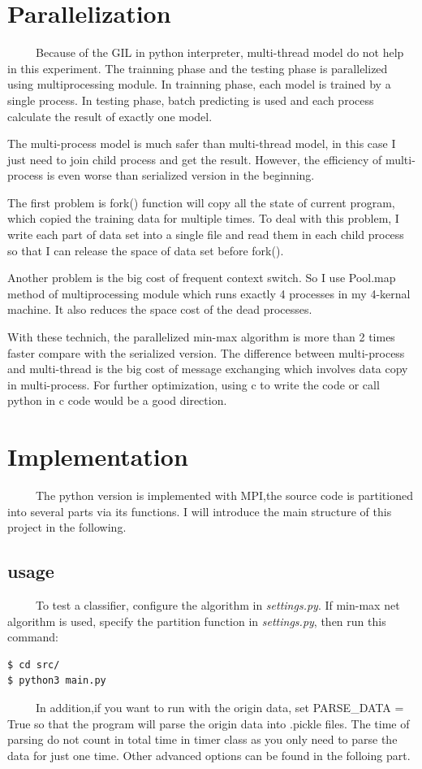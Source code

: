 \documentclass[11pt]{article}
\begin{document}
\section{Parallelization}
\label{sec-3}
\ \ \ \ \ Because of the GIL in python interpreter, multi-thread model do not help in this experiment.
The trainning phase and the testing phase is parallelized using multiprocessing module.
In trainning phase, each model is trained by a single process. In testing phase, batch predicting
is used and each process calculate the result of exactly one model.

The multi-process model is much safer than multi-thread model, in this case I just need to
join child process and get the result. However, the efficiency of multi-process is even
worse than serialized version in the beginning.

The first problem is fork() function will copy all the state of current program, which
copied the training data for multiple times. To deal with this problem, I write each part
of data set into a single file and read them in each child process so that I can release
the space of data set before fork().

Another problem is the big cost of frequent context switch. So I use Pool.map method of
multiprocessing module which runs exactly 4 processes in my 4-kernal machine. It also
reduces the space cost of the dead processes.

With these technich, the parallelized min-max algorithm is more than 2 times faster
compare with the serialized version.
The difference between multi-process and multi-thread is the big cost of message exchanging
which involves data copy in multi-process. For further optimization, using c to write the code
or call python in c code would be a good direction.

\section{Implementation}
\label{sec-4}
\ \ \ \ \ The python version is implemented with MPI,the source code is partitioned into several
parts via its functions. I will introduce the main structure of this project in the following.

\subsection{usage}
\label{sec-4-1}
\ \ \ \ \ To test a classifier, configure the algorithm in \emph{settings.py}. If min-max net algorithm
is used, specify the partition function in \emph{settings.py}, then run this command:
\begin{verbatim}
$ cd src/
$ python3 main.py
\end{verbatim}
\ \ \ \ \ In addition,if you want to run with the origin data, set PARSE\_DATA = True so
that the program will parse the origin data into .pickle files. The time of
parsing do not count in total time in timer class as you only need to parse the
data for just one time. Other advanced options can be found in the folloing part.
\end{document}
